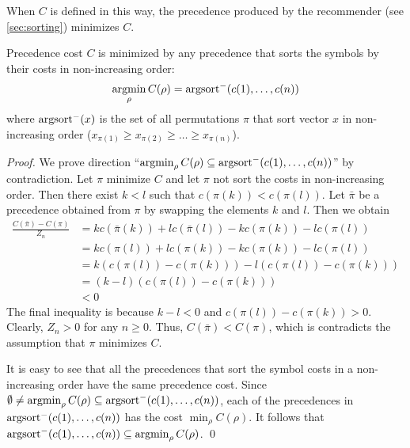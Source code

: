 When $C$ is defined in this way,
the precedence produced by the recommender (see \cref{sec:sorting}) minimizes $C$.

\begin{lemma}
Precedence cost $C$ is minimized by any precedence that sorts the symbols by their costs in non-increasing order:
$$
\operatorname*{argmin}_\rho C(\rho) = \operatorname{argsort}^- (c(1), \ldots, c(n))
$$
where $\operatorname{argsort}^-(x)$ is the set of all permutations $\pi$
that sort vector $x$ in non-increasing order ($x_{\pi(1)} \geq x_{\pi(2)} \geq \ldots \geq x_{\pi(n)}$).
\end{lemma}

\begin{proof}
We prove direction ``$\operatorname*{argmin}_\rho C(\rho) \subseteq \operatorname{argsort}^- (c(1), \ldots, c(n))$'' by contradiction.
Let $\pi$ minimize $C$ and let $\pi$ not sort the costs in non-increasing order.
Then there exist $k < l$ such that $c(\pi(k)) < c(\pi(l))$.
Let $\bar{\pi}$ be a precedence obtained from $\pi$ by swapping the elements $k$ and $l$.
Then we obtain
\begin{align*}
\frac{C(\bar{\pi}) - C(\pi)}{Z_n}
&= kc(\bar{\pi}(k)) + lc(\bar{\pi}(l)) - kc(\pi(k)) - lc(\pi(l)) \\
&= kc(\pi(l)) + lc(\pi(k)) - kc(\pi(k)) - lc(\pi(l)) \\
&= k(c(\pi(l)) - c(\pi(k))) - l(c(\pi(l)) - c(\pi(k))) \\
&= (k-l) (c(\pi(l)) - c(\pi(k))) \\
&< 0
\end{align*}
The final inequality is because $k-l < 0$ and $c(\pi(l)) - c(\pi(k)) > 0$.
Clearly, $Z_n > 0$ for any $n \geq 0$.
Thus, $C(\bar{\pi}) < C(\pi)$, which is contradicts the assumption that $\pi$ minimizes $C$.

It is easy to see that all the precedences that sort the symbol costs in a non-increasing order
have the same precedence cost.
Since $\emptyset \neq \operatorname*{argmin}_\rho C(\rho) \subseteq \operatorname{argsort}^- (c(1), \ldots, c(n))$,
each of the precedences in $\operatorname{argsort}^- (c(1), \ldots, c(n))$ has the cost $\min_\rho C(\rho)$.
It follows that $\operatorname{argsort}^- (c(1), \ldots, c(n)) \subseteq \operatorname*{argmin}_\rho C(\rho)$.
\qed
\end{proof}

